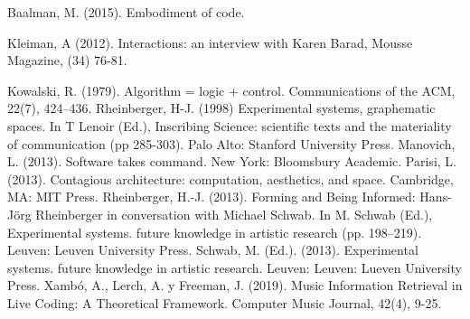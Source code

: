 Baalman, M. (2015). Embodiment of code.

Kleiman, A (2012). Interactions: an interview with Karen Barad, Mousse Magazine, (34) 76-81.

Kowalski, R. (1979). Algorithm = logic + control. Communications of the ACM, 22(7), 424–436.
Rheinberger, H-J. (1998) Experimental systems, graphematic spaces. In T Lenoir (Ed.), Inscribing Science: scientific texts and the materiality of communication (pp 285-303). Palo Alto: Stanford University Press.
Manovich, L. (2013). Software takes command. New York: Bloomsbury Academic.
Parisi, L. (2013). Contagious architecture: computation, aesthetics, and space. Cambridge, MA:
MIT Press.
Rheinberger, H.-J. (2013). Forming and Being Informed: Hans-Jörg Rheinberger in conversation with Michael Schwab. In M. Schwab (Ed.), Experimental systems. future knowledge in artistic research (pp. 198–219). Leuven: Leuven University Press.
Schwab, M. (Ed.). (2013). Experimental systems. future knowledge in artistic research. Leuven: Leuven: Lueven University Press.
Xambó, A., Lerch, A. y Freeman, J. (2019). Music Information Retrieval in Live Coding: A Theoretical Framework. Computer Music Journal, 42(4), 9-25.

